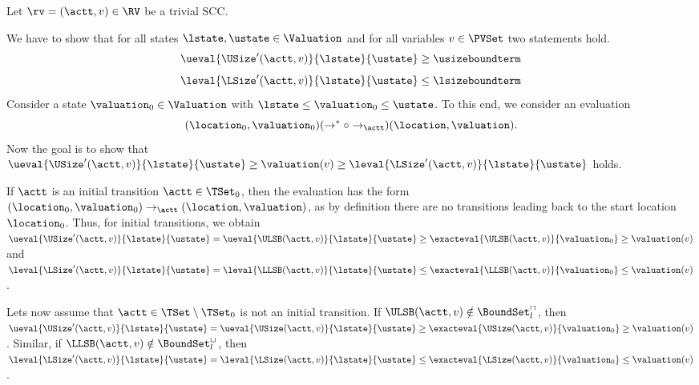 Let $\rv = (\actt, v) \in \RV$ be a trivial SCC.

We have to show that for all states $\lstate, \ustate \in \Valuation$ and for all variables $v \in \PVSet$ two statements hold.
\[ \ueval{\USize'(\actt, v)}{\lstate}{\ustate} \geq \usizeboundterm \]
\[ \leval{\LSize'(\actt, v)}{\lstate}{\ustate} \leq \lsizeboundterm \]
Consider a state $\valuation_0 \in \Valuation$ with $\lstate \leq \valuation_0 \leq \ustate$.
To this end, we consider an evaluation
\[ (\location_0, \valuation_0) (\rightarrow^* \circ \rightarrow_\actt) (\location, \valuation). \]
Now the goal is to show that $\ueval{\USize'(\actt, v)}{\lstate}{\ustate} \geq \valuation(v) \geq \leval{\LSize'(\actt, v)}{\lstate}{\ustate}$ holds.

If $\actt$ is an initial transition $\actt \in \TSet_0$, then the evaluation has the form $(\location_0, \valuation_0) \rightarrow_\actt (\location, \valuation)$, as by definition there are no transitions leading back to the start location $\location_0$.
Thus, for initial transitions, we obtain $\ueval{\USize'(\actt, v)}{\lstate}{\ustate} = \ueval{\ULSB(\actt, v)}{\lstate}{\ustate} \geq \exacteval{\ULSB(\actt, v)}{\valuation_0} \geq \valuation(v)$ and $\leval{\LSize'(\actt, v)}{\lstate}{\ustate} = \leval{\LLSB(\actt, v)}{\lstate}{\ustate} \leq \exacteval{\LLSB(\actt, v)}{\valuation_0} \leq \valuation(v)$.

Lets now assume that $\actt \in \TSet \setminus \TSet_0$ is not an initial transition.
If $\ULSB(\actt,v) \notin \BoundSet^\sqcap_l$, then $\ueval{\USize'(\actt, v)}{\lstate}{\ustate} = \ueval{\USize(\actt, v)}{\lstate}{\ustate} \geq \exacteval{\USize(\actt, v)}{\valuation_0} \geq \valuation(v)$.
Similar, if $\LLSB(\actt,v) \notin \BoundSet^\sqcup_l$, then $\leval{\LSize'(\actt, v)}{\lstate}{\ustate} = \leval{\LSize(\actt, v)}{\lstate}{\ustate} \leq \exacteval{\LSize(\actt, v)}{\valuation_0} \leq \valuation(v)$.

